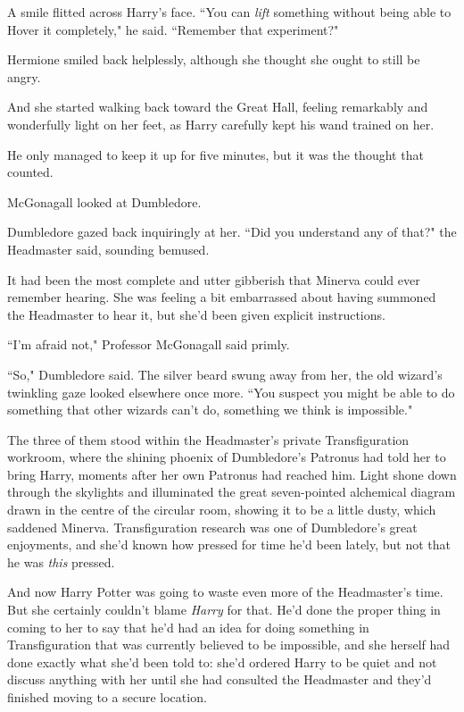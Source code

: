 A smile flitted across Harry's face. ``You can \emph{lift} something without being able to Hover it completely," he said. ``Remember that experiment?"

Hermione smiled back helplessly, although she thought she ought to still be angry.

And she started walking back toward the Great Hall, feeling remarkably and wonderfully light on her feet, as Harry carefully kept his wand trained on her.

He only managed to keep it up for five minutes, but it was the thought that counted.

\later

McGonagall looked at Dumbledore.

Dumbledore gazed back inquiringly at her. ``Did you understand any of that?" the Headmaster said, sounding bemused.

It had been the most complete and utter gibberish that Minerva could ever remember hearing. She was feeling a bit embarrassed about having summoned the Headmaster to hear it, but she'd been given explicit instructions.

``I'm afraid not," Professor McGonagall said primly.

``So," Dumbledore said. The silver beard swung away from her, the old wizard's twinkling gaze looked elsewhere once more. ``You suspect you might be able to do something that other wizards can't do, something we think is impossible."

The three of them stood within the Headmaster's private Transfiguration workroom, where the shining phoenix of Dumbledore's Patronus had told her to bring Harry, moments after her own Patronus had reached him. Light shone down through the skylights and illuminated the great seven-pointed alchemical diagram drawn in the centre of the circular room, showing it to be a little dusty, which saddened Minerva. Transfiguration research was one of Dumbledore's great enjoyments, and she'd known how pressed for time he'd been lately, but not that he was \emph{this} pressed.

And now Harry Potter was going to waste even more of the Headmaster's time. But she certainly couldn't blame \emph{Harry} for that. He'd done the proper thing in coming to her to say that he'd had an idea for doing something in Transfiguration that was currently believed to be impossible, and she herself had done exactly what she'd been told to: she'd ordered Harry to be quiet and not discuss anything with her until she had consulted the Headmaster and they'd finished moving to a secure location.


